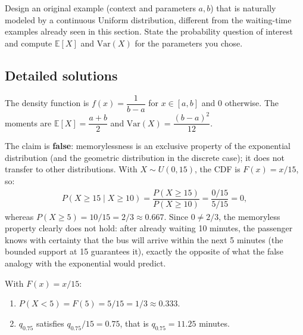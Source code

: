 \begin{problema}
	\label{prob:c1c6ece}
	Design an original example (context and parameters $a,b$) that is naturally modeled by a continuous Uniform distribution, different from the waiting-time examples already seen in this section. State the probability question of interest and compute $\mathbb{E}[X]$ and $\text{Var}(X)$ for the parameters you chose.
\end{problema}

\subsection*{Detailed solutions}

\begin{solproblema}[prob:97c4388]
	The density function is $f(x) = \dfrac{1}{b-a}$ for $x \in [a,b]$ and $0$ otherwise. The moments are $\mathbb{E}[X] = \dfrac{a+b}{2}$ and $\text{Var}(X) = \dfrac{(b-a)^2}{12}$.
\end{solproblema}

\begin{solproblema}[prob:9f6e77c]
	The claim is \textbf{false}: memorylessness is an exclusive property of the exponential distribution (and the geometric distribution in the discrete case); it does not transfer to other distributions. With $X \sim U(0,15)$, the CDF is $F(x)=x/15$, so:
	\begin{align*}
		P(X \ge 15 \mid X \ge 10) = \dfrac{P(X\ge15)}{P(X\ge10)} = \dfrac{0/15}{5/15} = 0,
	\end{align*}
	whereas $P(X\ge5) = 10/15 = 2/3 \approx 0.667$. Since $0 \neq 2/3$, the memoryless property clearly does not hold: after already waiting 10 minutes, the passenger knows with certainty that the bus will arrive within the next 5 minutes (the bounded support at 15 guarantees it), exactly the opposite of what the false analogy with the exponential would predict.
\end{solproblema}

\begin{solproblema}
	With $F(x) = x/15$:
	\begin{enumerate}
		\item $P(X<5) = F(5) = 5/15 = 1/3 \approx 0.333$.
		\item $q_{0.75}$ satisfies $q_{0.75}/15 = 0.75$, that is $q_{0.75} = 11.25$ minutes.
	\end{enumerate}
\end{solproblema}

